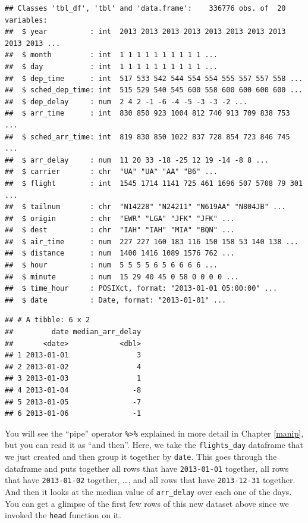 \documentclass[]{tufte-book}
\newenvironment{Shaded}{\begin{snugshade}}{\end{snugshade}}
\newcommand{\KeywordTok}[1]{\textcolor[rgb]{0.13,0.29,0.53}{\textbf{{#1}}}}
\newcommand{\DataTypeTok}[1]{\textcolor[rgb]{0.13,0.29,0.53}{{#1}}}
\newcommand{\StringTok}[1]{\textcolor[rgb]{0.31,0.60,0.02}{{#1}}}
\newcommand{\OtherTok}[1]{\textcolor[rgb]{0.56,0.35,0.01}{{#1}}}
\newcommand{\NormalTok}[1]{{#1}}
\begin{document}
\begin{verbatim}
## Classes 'tbl_df', 'tbl' and 'data.frame':    336776 obs. of  20 variables:
##  $ year          : int  2013 2013 2013 2013 2013 2013 2013 2013 2013 2013 ...
##  $ month         : int  1 1 1 1 1 1 1 1 1 1 ...
##  $ day           : int  1 1 1 1 1 1 1 1 1 1 ...
##  $ dep_time      : int  517 533 542 544 554 554 555 557 557 558 ...
##  $ sched_dep_time: int  515 529 540 545 600 558 600 600 600 600 ...
##  $ dep_delay     : num  2 4 2 -1 -6 -4 -5 -3 -3 -2 ...
##  $ arr_time      : int  830 850 923 1004 812 740 913 709 838 753 ...
##  $ sched_arr_time: int  819 830 850 1022 837 728 854 723 846 745 ...
##  $ arr_delay     : num  11 20 33 -18 -25 12 19 -14 -8 8 ...
##  $ carrier       : chr  "UA" "UA" "AA" "B6" ...
##  $ flight        : int  1545 1714 1141 725 461 1696 507 5708 79 301 ...
##  $ tailnum       : chr  "N14228" "N24211" "N619AA" "N804JB" ...
##  $ origin        : chr  "EWR" "LGA" "JFK" "JFK" ...
##  $ dest          : chr  "IAH" "IAH" "MIA" "BQN" ...
##  $ air_time      : num  227 227 160 183 116 150 158 53 140 138 ...
##  $ distance      : num  1400 1416 1089 1576 762 ...
##  $ hour          : num  5 5 5 5 6 5 6 6 6 6 ...
##  $ minute        : num  15 29 40 45 0 58 0 0 0 0 ...
##  $ time_hour     : POSIXct, format: "2013-01-01 05:00:00" ...
##  $ date          : Date, format: "2013-01-01" ...
\end{verbatim}

\begin{Shaded}
\end{Shaded}

\begin{verbatim}
## # A tibble: 6 x 2
##         date median_arr_delay
##       <date>            <dbl>
## 1 2013-01-01                3
## 2 2013-01-02                4
## 3 2013-01-03                1
## 4 2013-01-04               -8
## 5 2013-01-05               -7
## 6 2013-01-06               -1
\end{verbatim}

You will see the ``pipe'' operator \texttt{\%\textgreater{}\%} explained
in more detail in Chapter \ref{manip}, but you can read it as ``and
then''. Here, we take the \texttt{flights\_day} dataframe that we just
created and then group it together by \texttt{date}. This goes through
the dataframe and puts together all rows that have \texttt{2013-01-01}
together, all rows that have \texttt{2013-01-02} together, \ldots{}, and
all rows that have \texttt{2013-12-31} together. And then it looks at
the median value of \texttt{arr\_delay} over each one of the days. You
can get a glimpse of the first few rows of this new dataset above since
we invoked the \texttt{head} function on it.
\end{document}

